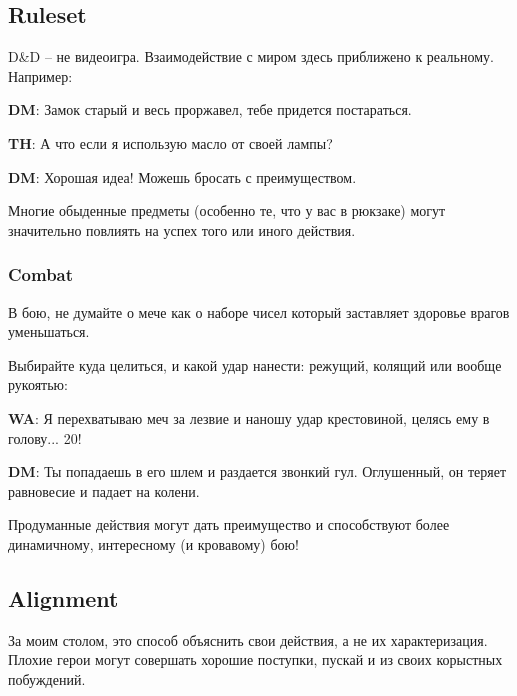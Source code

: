 \documentclass[a4paper,11pt]{book}
\newenvironment{Frame}{%
        \begin{tcolorbox}[%
            notitle, sharp corners, colback=white!98!black,
            frame hidden,
            borderline west = {0.1pt}{0pt}{black},
            borderline east = {0.1pt}{0pt}{black},
            boxrule=0.5pt, boxsep=0pt, enhanced,
            fuzzy shadow={0pt}{0pt}{-1pt}{0.6pt}{opacity=0.04,white!70!black}
        ]%
        \setlength{\leftskip}{0.7em}
        \setlength{\parindent}{-\leftskip}
    }{%
        \end{tcolorbox}
    }
\begin{document}
\begin{multicols}{2}

\chapter{Ruleset}

D\&D -- не видеоигра. Взаимодействие с миром здесь приближено к реальному. Например:

\begin{Frame}
\textbf{DM}: Замок старый и весь проржавел, тебе придется постараться.

\textbf{TH}: А что если я использую масло от своей лампы?

\textbf{DM}: Хорошая идеа! Можешь бросать с преимуществом.
\end{Frame}


Многие обыденные предметы (особенно те, что у вас в рюкзаке) могут значительно повлиять на успех того или иного действия.

\subsection{Combat}

В бою, не думайте о мече как о наборе чисел который заставляет здоровье врагов уменьшаться.

Выбирайте куда целиться, и какой удар нанести: режущий, колящий или вообще рукоятью:

\begin{Frame}
\textbf{WA}: Я перехватываю меч за лезвие и наношу удар крестовиной, целясь ему в голову... 20!

\textbf{DM}: Ты попадаешь в его шлем и раздается звонкий гул. Оглушенный, он теряет равновесие и падает на колени.
\end{Frame}

Продуманные действия могут дать преимущество и способствуют более динамичному, интересному (и кровавому) бою!

\section{Alignment}

За моим столом, это способ объяснить свои действия, а не их характеризация. Плохие герои могут совершать хорошие поступки, пускай и из своих корыстных побуждений.


\end{multicols}
\end{document}
